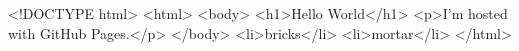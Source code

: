 <!DOCTYPE html>
<html>
<body>
<h1>Hello World</h1>
<p>I'm hosted with GitHub Pages.</p>
</body>
<li>bricks</li>
<li>mortar</li>
</html>